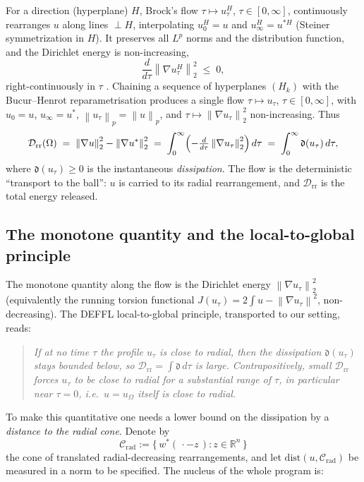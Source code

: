 \documentclass[11pt]{article}
\theoremstyle{definition}
\newcommand{\R}{\mathbb R}
\newcommand{\Om}{\Omega}
\newcommand{\Drr}{\mathcal D_{\mathrm{rr}}}
\newcommand{\norm}[1]{\left\|#1\right\|}
\begin{document}
For a direction (hyperplane) $H$, Brock's flow $\tau\mapsto u^{H}_\tau$,
$\tau\in[0,\infty]$, continuously rearranges $u$ along lines $\perp H$,
interpolating $u^H_0=u$ and $u^H_\infty=u^{*H}$ (Steiner symmetrization in
$H$). It preserves all $L^p$ norms and the distribution function, and the
Dirichlet energy is non-increasing,
\begin{equation}\label{eq:brock-mono}
   \frac{d}{d\tau}\norm{\nabla u^H_\tau}_2^2\;\le\;0,
\end{equation}
right-continuously in $\tau$ \cite{Brock1,Brock2}. Chaining a sequence of
hyperplanes $(H_k)$ with the Bucur--Henrot reparametrisation produces a
single flow $\tau\mapsto u_\tau$, $\tau\in[0,\infty]$, with $u_0=u$,
$u_\infty=u^*$, $\norm{u_\tau}_p=\norm{u}_p$, and
$\tau\mapsto\norm{\nabla u_\tau}_2^2$ non-increasing. Thus
\begin{equation}\label{eq:Drr-integral}
   \Drr(\Om)\;=\;\norm{\nabla u}_2^2-\norm{\nabla u^*}_2^2
   \;=\;\int_0^\infty\Bigl(-\tfrac{d}{d\tau}\norm{\nabla u_\tau}_2^2\Bigr)\,d\tau
   \;=\;\int_0^\infty \mathfrak d(u_\tau)\,d\tau,
\end{equation}
where $\mathfrak d(u_\tau)\ge0$ is the instantaneous \emph{dissipation}. The
flow is the deterministic ``transport to the ball'': $u$ is carried to its
radial rearrangement, and $\Drr$ is the total energy released.

\subsection{The monotone quantity and the local-to-global principle}

The monotone quantity along the flow is the Dirichlet energy
$\norm{\nabla u_\tau}_2^2$ (equivalently the running torsion functional
$J(u_\tau)=2\int u-\norm{\nabla u_\tau}^2$, non-decreasing). The DEFFL
local-to-global principle, transported to our setting, reads:

\begin{quote}
\emph{If at no time $\tau$ the profile $u_\tau$ is close to radial, then the
dissipation $\mathfrak d(u_\tau)$ stays bounded below, so $\Drr=\int\mathfrak
d\,d\tau$ is large. Contrapositively, small $\Drr$ forces $u_\tau$ to be
close to radial for a substantial range of $\tau$, in particular near
$\tau=0$, i.e.\ $u=u_\Om$ itself is close to radial.}
\end{quote}

To make this quantitative one needs a lower bound on the dissipation by a
\emph{distance to the radial cone}. Denote by
\[
   \mathcal C_{\mathrm{rad}}:=\{\,w^*(\,\cdot-z\,):z\in\R^n\,\}
\]
the cone of translated radial-decreasing rearrangements, and let
$\mathrm{dist}(u,\mathcal C_{\mathrm{rad}})$ be measured in a norm to be
specified. The nucleus of the whole program is:
\end{document}

